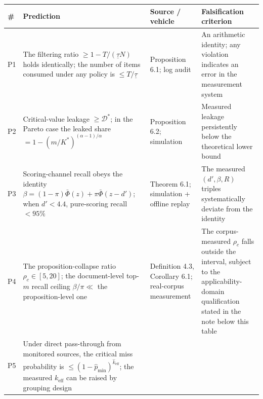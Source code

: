 \documentclass[
  11pt]{article}
\begin{document}
\begin{longtable}[]{@{}
  >{\raggedright\arraybackslash}p{}
  >{\raggedright\arraybackslash}p{}
  >{\raggedright\arraybackslash}p{}
  >{\raggedright\arraybackslash}p{}@{}}
\toprule\noalign{}
\begin{minipage}[b]{\linewidth}\raggedright
\#
\end{minipage} & \begin{minipage}[b]{\linewidth}\raggedright
Prediction
\end{minipage} & \begin{minipage}[b]{\linewidth}\raggedright
Source / vehicle
\end{minipage} & \begin{minipage}[b]{\linewidth}\raggedright
Falsification criterion
\end{minipage} \\
\midrule\noalign{}
\endhead
\bottomrule\noalign{}
\endlastfoot
P1 & The filtering ratio \(\ge 1 - T/(\underline\tau N)\) holds
identically; the number of items consumed under any policy is
\(\le T/\underline\tau\) & Proposition 6.1; log audit & An arithmetic
identity; any violation indicates an error in the measurement system \\
P2 & Critical-value leakage \(\ge \mathcal{D}^*\); in the Pareto case
the leaked share \(= 1-(m/K^*)^{(\alpha-1)/\alpha}\) & Proposition 6.2;
simulation & Measured leakage persistently below the theoretical lower
bound \\
P3 & Scoring-channel recall obeys the identity
\(\beta = (1-\pi)\bar\Phi(z) + \pi\bar\Phi(z-d')\); when \(d' < 4.4\),
pure-scoring recall \(< 95\%\) & Theorem 6.1; simulation + offline
replay & The measured \((d', \beta, R)\) triples systematically deviate
from the identity \\
P4 & The proposition-collapse ratio \(\rho_c \in [5, 20]\); the
document-level top-\(m\) recall ceiling \(\beta/\pi \ll\) the
proposition-level one & Definition 4.3, Corollary 6.1; real-corpus
measurement & The corpus-measured \(\rho_c\) falls outside the interval,
subject to the applicability-domain qualification stated in the note
below this table \\
P5 & Under direct pass-through from monitored sources, the critical miss
probability is \(\le (1-\hat p_{\min})^{\hat k_{\mathrm{eff}}}\); the
measured \(k_{\mathrm{eff}}\) can be raised by grouping design &

\end{longtable}
\end{document}

